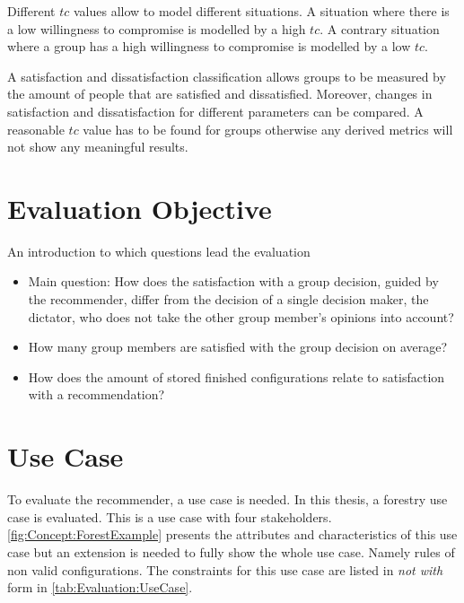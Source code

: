 Different $tc$ values allow to model different situations. A situation where there is a low willingness to compromise is modelled by a high $tc$. A contrary situation where a group has a high willingness to compromise is modelled by a low $tc$.

A satisfaction and dissatisfaction classification allows groups to be measured by the amount of people that are satisfied and dissatisfied. Moreover, changes in satisfaction and dissatisfaction for different parameters can be compared. A reasonable $tc$ value has to be found for groups otherwise any derived metrics will not show any meaningful results.

\section{Evaluation Objective}
\label{sec:Evaluation:Questions}

An introduction to which questions lead the evaluation


\begin{itemize}
    \item Main question: How does the satisfaction with a group decision, guided by the recommender, differ from the decision of a single decision maker, the dictator, who does not take the other group member's opinions into account?
    \item How many group members are satisfied with the group decision on average?
    \item How does the amount of stored finished configurations relate to satisfaction with a recommendation?
\end{itemize}

\section{Use Case}
\label{sec:Evaluation:UseCase}

To evaluate the recommender, a use case is needed. In this thesis, a forestry use case is evaluated. This is a use case with four stakeholders. \autoref{fig:Concept:ForestExample} presents the attributes and characteristics of this use case but an extension is needed to fully show the whole use case. Namely rules of non valid configurations. The constraints for this use case are listed in \emph{not with} form in \autoref{tab:Evaluation:UseCase}. 

